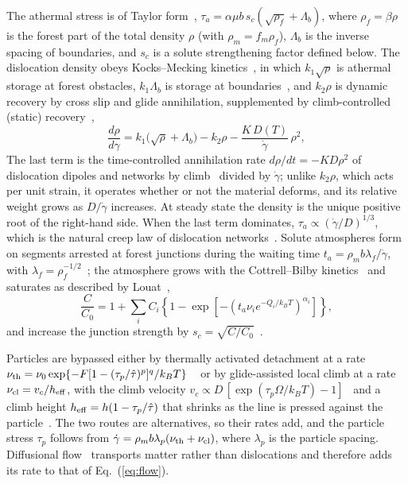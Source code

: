 \documentclass[aps,prl,twocolumn,superscriptaddress,amsmath,amssymb,floatfix]{revtex4-2}
\newcommand{\gd}{\dot\gamma}
\newcommand{\kT}{k_BT}
\begin{document}
The athermal stress is of Taylor form~\cite{Taylor1934,KocksMecking2003}, $\tau_a=\alpha\mu b\,s_c(\sqrt{\rho_f}+\Lambda_b)$, where $\rho_f=\beta\rho$ is the forest part of the total density $\rho$ (with $\rho_m=f_m\rho_f$), $\Lambda_b$ is the inverse spacing of boundaries, and $s_c$ is a solute strengthening factor defined below. The dislocation density obeys Kocks--Mecking kinetics~\cite{Kocks1976,MeckingKocks,KocksMecking2003}, in which $k_1\sqrt\rho$ is athermal storage at forest obstacles, $k_1\Lambda_b$ is storage at boundaries~\cite{EstrinMecking1984,Estrin1996}, and $k_2\rho$ is dynamic recovery by cross slip and glide annihilation, supplemented by climb-controlled (static) recovery~\cite{SandstromLagneborg1975,Sandstrom1977,Nes1995,SandstromHallgren2012},
\begin{equation}
\frac{d\rho}{d\gamma}=k_1\big(\sqrt\rho+\Lambda_b\big)-k_2\rho-\frac{K\,D(T)}{\gd}\,\rho^2 ,
\label{eq:km}
\end{equation}
The last term is the time-controlled annihilation rate $d\rho/dt=-KD\rho^2$ of dislocation dipoles and networks by climb~\cite{SandstromLagneborg1975,Sandstrom1977,Nes1995} divided by $\gd$; unlike $k_2\rho$, which acts per unit strain, it operates whether or not the material deforms, and its relative weight grows as $D/\gd$ increases. At steady state the density is the unique positive root of the right-hand side. When the last term dominates, $\tau_a\propto(\gd/D)^{1/3}$, which is the natural creep law of dislocation networks~\cite{Poirier1985,Blum2002}. Solute atmospheres form on segments arrested at forest junctions during the waiting time $t_a=\rho_m b\lambda_f/\gd$, with $\lambda_f=\rho_f^{-1/2}$~\cite{McCormick1988,KubinEstrin1990}; the atmosphere grows with the Cottrell--Bilby kinetics~\cite{CottrellBilby} and saturates as described by Louat~\cite{Louat1981},
\begin{equation}
\frac{C}{C_0}=1+\sum_iC_i\left\{1-\exp\!\left[-\left(t_a\nu_ie^{-Q_i/\kT}\right)^{\alpha_i}\right]\right\},
\label{eq:aging}
\end{equation}
and increase the junction strength by $s_c=\sqrt{C/C_0}$~\cite{Cheng2001,MulfordKocks1979}.

Particles are bypassed either by thermally activated detachment at a rate $\nu_{\rm th}=\nu_0\exp\{-F[1-(\tau_p/\hat\tau)^{p}]^{q}/\kT\}$ ~\cite{KocksArgonAshby,RoslerArzt} or by glide-assisted local climb at a rate $\nu_{\rm cl}=v_c/h_{\rm eff}$, with the climb velocity $v_c\propto D\,[\exp(\tau_p\Omega/\kT)-1]$~\cite{HirthLothe} and a climb height $h_{\rm eff}=h(1-\tau_p/\hat\tau)$ that shrinks as the line is pressed against the particle~\cite{BrownHam,ArztAshby1982}. The two routes are alternatives, so their rates add, and the particle stress $\tau_p$ follows from $\gd=\rho_m b\lambda_p(\nu_{\rm th}+\nu_{\rm cl})$, where $\lambda_p$ is the particle spacing. Diffusional flow~\cite{Nabarro1948,Herring1950,Coble1963,FrostAshby} transports matter rather than dislocations and therefore adds its rate to that of Eq.~(\ref{eq:flow}).
\end{document}
